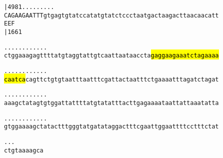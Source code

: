 \documentclass{article}
\begin{document}
\newpage
\begin{alltt}
     |4981     .    .    .    .    .    .    .    .    .    
CAGAAGAATTTgtgagtgtatccatatgtatctccctaatgactaagacttaacaacatt
  E  E  F                                                   
     |1661                                                  

.    .    .    .    .    .    .    .    .    .    .    .    
ctggaaagagttttatgtaggtattgtcaattaataaccta\hl{gaggaagaaatctagaaaa}

.    .    .    .    .    .    .    .    .    .    .    .    
\hl{caatca}cagttctgtgtaatttaatttcgattactaatttctgaaaatttagatctagat

.    .    .    .    .    .    .    .    .    .    .    .    
aaagctatagtgtggattattttatgtatatttacttgagaaaataattattaaatatta

.    .    .    .    .    .    .    .    .    .    .    .    
gtggaaaagctatactttgggtatgatataggactttcgaattggaattttcctttctat

.    .    .
ctgtaaaagca
\end{alltt}
\newpage
\end{document}

